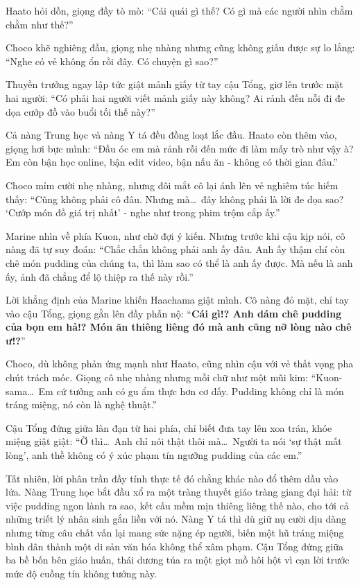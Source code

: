 \documentclass[../main.tex]{subfiles}
\begin{document}

Haato hỏi dồn, giọng đầy tò mò: ``Cái quái gì thế? Có gì mà các người nhìn chằm chằm như thế?''

Choco khẽ nghiêng đầu, giọng nhẹ nhàng nhưng cũng không giấu được sự lo lắng: ``Nghe có vẻ không ổn rồi đây. Có chuyện gì sao?''

Thuyền trưởng ngay lập tức giật mảnh giấy từ tay cậu Tổng, giơ lên trước mặt hai người: ``Có phải hai người viết mảnh giấy này không? Ai rảnh đến nỗi đi đe dọa cướp đồ vào buổi tối thế này?''

Cả nàng Trung học và nàng Y tá đều đồng loạt lắc đầu. Haato còn thêm vào, giọng hơi bực mình: ``Đầu óc em mà rảnh rỗi đến mức đi làm mấy trò như vậy à? Em còn bận học online, bận edit video, bận nấu ăn - không có thời gian đâu.''

Choco mỉm cười nhẹ nhàng, nhưng đôi mắt cô lại ánh lên vẻ nghiêm túc hiếm thấy: ``Cũng không phải cô đâu. Nhưng mà\dots\ đây không phải là lời đe dọa sao? `Cướp món đồ giá trị nhất' - nghe như trong phim trộm cắp ấy.''

Marine nhìn về phía Kuon, như chờ đợi ý kiến. Nhưng trước khi cậu kịp nói, cô nàng đã tự suy đoán: ``Chắc chắn không phải anh ấy đâu. Anh ấy thậm chí còn chê món pudding của chúng ta, thì làm sao có thể là anh ấy được. Mà nếu là anh ấy, ảnh đã chẳng để lộ thiệp ra thế này rồi.''

Lời khẳng định của Marine khiến Haachama giật mình. Cô nàng đỏ mặt, chỉ tay vào cậu Tổng, giọng gằn lên đầy phẫn nộ: ``\textbf{Cái gì!? Anh dám chê pudding của bọn em hả!? Món ăn thiêng liêng đó mà anh cũng nỡ lòng nào chê ư!?}''

Choco, dù không phản ứng mạnh như Haato, cũng nhìn cậu với vẻ thất vọng pha chút trách móc. Giọng cô nhẹ nhàng nhưng mỗi chữ như một mũi kim: ``Kuon-sama\dots\ Em cứ tưởng anh có gu ẩm thực hơn cơ đấy. Pudding không chỉ là món tráng miệng, nó còn là nghệ thuật.''

Cậu Tổng đứng giữa làn đạn từ hai phía, chỉ biết đưa tay lên xoa trán, khóe miệng giật giật: ``Ờ thì\dots\ Anh chỉ nói thật thôi mà\dots\ Người ta nói `sự thật mất lòng', anh thề không có ý xúc phạm tín ngưỡng pudding của các em.''

Tất nhiên, lời phân trần đầy tính thực tế đó chẳng khác nào đổ thêm dầu vào lửa. Nàng Trung học bắt đầu xổ ra một tràng thuyết giáo tràng giang đại hải: từ việc pudding ngon lành ra sao, kết cấu mềm mịn thiêng liêng thế nào, cho tới cả những triết lý nhân sinh gắn liền với nó. Nàng Y tá thì dù giữ nụ cười dịu dàng nhưng từng câu chất vấn lại mang sức nặng ép người, biến một hũ tráng miệng bình dân thành một di sản văn hóa không thể xâm phạm. Cậu Tổng đứng giữa ba bề bốn bên giáo huấn, thái dương túa ra một giọt mồ hôi hột vì cạn lời trước mức độ cuồng tín không tưởng này.
\end{document}
